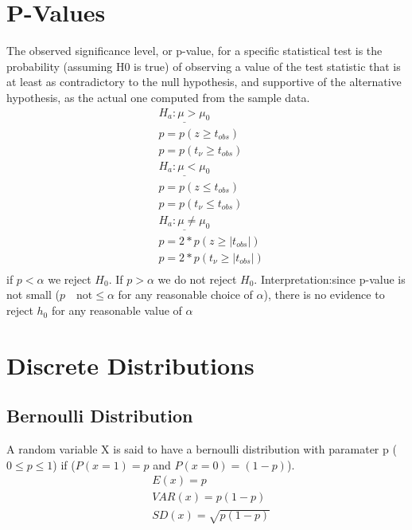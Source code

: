 \documentclass[fontsize=6pt, paper=a4]{scrartcl}
\begin{document}
\begin{multicols*}{4}
{\section{P-Values}
The observed significance level, or p-value, for a specific statistical test is the probability (assuming H0 is true) of observing a value of the test statistic that is at least as contradictory to the null hypothesis, and supportive of the alternative hypothesis, as the actual one computed from the sample data.
\begin{align}
	&\underline{H_a:\mu > \mu_0}\\
	&p=p(z\geq t_{obs})\\
	&p=p(t_{\nu}\geq t_{obs})\\
	&\underline{H_a:\mu < \mu_0}\\
	&p=p(z\leq t_{obs})\\
	&p=p(t_{\nu}\leq t_{obs})\\
	&\underline{H_a:\mu \neq \mu_0}\\
	&p=2*p(z\geq |t_{obs}|)\\
	&p=2*p(t_{\nu}\geq |t_{obs}|)\\
\end{align}
if $p<\alpha$ we reject $H_0$. If $p> \alpha$ we do not reject $H_0$.
Interpretation:since p-value is not small ($p \quad\textrm{not}\leq \alpha$ for any reasonable choice of $\alpha$), there is no evidence to reject $h_0$ for any reasonable value of $\alpha$
\section{Discrete Distributions}
\subsection{Bernoulli Distribution}
A random variable X is said to have a bernoulli distribution with paramater p ($0\leq p \leq 1$) if ($P(x=1)=p$ and $P(x=0)=(1-p)$).
\begin{align}
	&E(x)=p\\
	&VAR(x)=p(1-p)\\
	&SD(x)=\sqrt{p(1-p)}
\end{align}
}
\end{multicols*}
\end{document}
